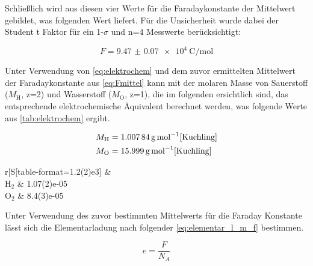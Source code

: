 \documentclass[11pt,ngerman]{scrartcl}
\begin{document}
Schließlich wird aus diesen vier Werte für die Faradaykonstante der Mittelwert gebildet, was folgenden Wert liefert. Für die Unsicherheit wurde dabei der Student t Faktor für ein 1-$\sigma$ und n=4 Messwerte berücksichtigt:

\begin{equation}
	F = \SI{9.47(7)e4}{\coulomb\per\mol}
	\label{eq:Fmittel}
\end{equation}

Unter Verwendung von
\autoref{eq:elektrochem} und dem zuvor ermittelten Mittelwert der Faradaykonstante aus \autoref{eq:Fmittel} kann mit
der molaren Masse von Sauerstoff ($M_{\text{H}}$, z=2) und Wasserstoff ($M_{\text{O}}$, z=1), die im folgenden ersichtlich sind, das entsprechende elektrochemische Äquivalent berechnet werden, was folgende Werte aus \autoref{tab:elektrochem} ergibt.

\begin{align*}
	M_{\text{H}} & = \SI{1.00784}{\g\per\mol}\cite{Kuchling} \\
	M_{\text{O}} & = \SI{15.999}{\g\per\mol}\cite{Kuchling}
\end{align*}

\begin{table}[H]
	\caption{bestimmte elektrochemische Äquivalente\\
		H$_2 \dots$ Wasserstoff\\
		O$_2 \dots$ Sauerstoff\\
		$C \dots$ bestimmtes elektrochemische Äquivalent}
	\label{tab:elektrochem}
	\begin{center}
		\begin{tabular}[c]{r|S[table-format=1.2(2)e3]}
			\hline
			 &
			 \\
			\hline
			{H$_2$}                            & 1.07(2)e-05        \\
			{O$_2$}                            & 8.4(3)e-05         \\
			\hline
		\end{tabular}
	\end{center}
\end{table}

Unter Verwendung des zuvor bestimmten Mittelwerts für die Faraday Konstante lässt sich die Elementarladung nach folgender \autoref{eq:elementar_l_m_f} bestimmen.

\begin{equation}
	e = \frac{F}{N_A}
	\label{eq:elementar_l_m_f}
\end{equation}
\end{document}
